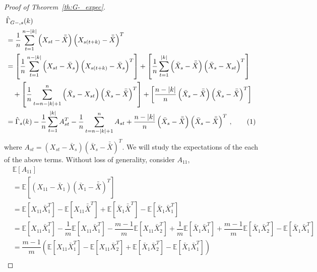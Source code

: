 \documentclass[11pt]{article}
\newcommand{\E}{\mathbb{E}}
\newcommand\numberthis{\addtocounter{equation}{1}\tag{\theequation}}
\theoremstyle{remark}
\begin{document}
\begin{proof}[Proof of Theorem~\ref{th:G-_expec}]
\begin{align*}
    & \hat{\Gamma}_{G-,s}(k) \\
   & = \dfrac{1}{n}\sum_{t=1}^{n-|k|} \left(X_{st} - \bar{\bar{X}} \right) \left(X_{s(t+k)} - \bar{\bar{X}} \right)^T \\
    &= \left[\dfrac{1}{n} \sum_{t=1}^{n-|k|} \left(X_{st} - \bar{X}_s \right) \left(X_{s(t+k)} - \bar{X}_s \right)^T \right] + \left[\dfrac{1}{n} \sum_{t=1}^{|k|} \left(\bar{X}_s - \bar{\bar{X}} \right)  \left(\bar{X}_s - X_{st} \right)^T\right] \\ 
    & \quad +  \left[\dfrac{1}{n} \sum_{t=n-|k|+1}^{n}  \left( \bar{X}_s - X_{st} \right)  \left(\bar{X}_s - \bar{\bar{X}} \right)^T\right] + \left[\dfrac{n-|k|}{n} \left(\bar{X}_s - \bar{\bar{X}}\right)   \left(\bar{X}_s - \bar{\bar{X}} \right)^T\right]\\
    &= \hat{\Gamma}_s(k) - \dfrac{1}{n} \sum_{t=1}^{|k|}A_{st}^T - \dfrac{1}{n}\sum_{t=n-|k|+1}^{n}A_{st} + \dfrac{n-|k|}{n}  \left(\bar{X}_s - \bar{\bar{X}} \right)  \left(\bar{X}_s - \bar{\bar{X}} \right)^T\,, \numberthis \label{eq:acf_breakdown}
\end{align*}
%
where $A_{st} = (X_{st}-\bar{X}_s)(\bar{X}_s - \bar{\bar{X}})^T$. We will study the expectations of the each of the above terms. Without loss of generality, consider $A_{11}$,
\begin{align*}
    &\E \left[A_{11} \right]\\
     &= \mathbb{E} \left[ \left(X_{11} - \bar{X}_1 \right) \left(\bar{X}_1 - \bar{\bar{X}} \right)^T \right]\\
     &= \mathbb{E} \left[X_{11}\bar{X}_1^T \right] - \mathbb{E}\left[X_{11}\bar{\bar{X}}^T \right] + \mathbb{E} \left[\bar{X}_1\bar{\bar{X}}^T \right] - \mathbb{E} \left[\bar{X}_1\bar{X}_1^T \right]\\
    &= \mathbb{E} \left[X_{11}\bar{X}_1^T \right] - \dfrac{1}{m}\mathbb{E} \left[X_{11}\bar{X}_1^T \right] - \dfrac{m-1}{m}\mathbb{E} \left[X_{11}\bar{X}_2^T \right] + \dfrac{1}{m}\mathbb{E} \left[\bar{X}_1\bar{X}_1^T \right] + \dfrac{m-1}{m}\mathbb{E} \left[\bar{X}_1\bar{X}_2^T \right] - \mathbb{E} \left[\bar{X}_1\bar{X}_1^T \right]\\
    &= \dfrac{m-1}{m}\left(\mathbb{E} \left[X_{11}\bar{X}_1^T \right] - \mathbb{E} \left[X_{11}\bar{X}_2^T \right] + \mathbb{E} \left[\bar{X}_1\bar{X}_2^T \right] - \mathbb{E} \left[\bar{X}_1\bar{X}_1^T \right]\right)\\

\end{align*}
\end{proof}
\end{document}
